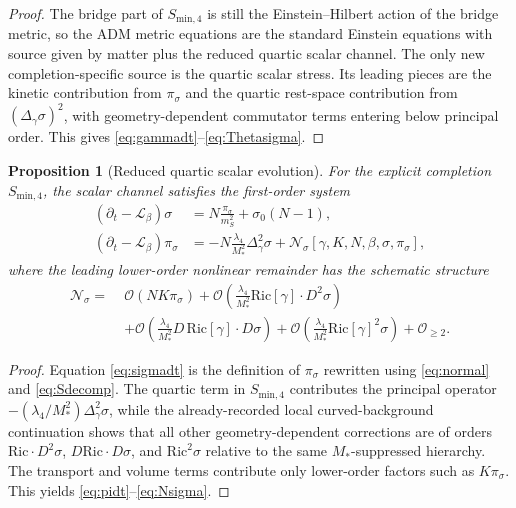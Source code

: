 \documentclass[11pt]{article}
\newcommand{\Ell}{\mathcal{L}}
\newtheorem{proposition}{Proposition}
\begin{document}
\begin{proof}
The bridge part of \(S_{\mathrm{min},4}\) is still the Einstein--Hilbert action of the bridge metric, so the ADM metric equations are the standard Einstein equations with source given by matter plus the reduced quartic scalar channel. The only new completion-specific source is the quartic scalar stress. Its leading pieces are the kinetic contribution from \(\pi_\sigma\) and the quartic rest-space contribution from \((\Delta_\gamma\sigma)^2\), with geometry-dependent commutator terms entering below principal order. This gives \eqref{eq:gammadt}--\eqref{eq:Thetasigma}.
\end{proof}

\begin{proposition}[Reduced quartic scalar evolution]
For the explicit completion \(S_{\mathrm{min},4}\), the scalar channel satisfies the first-order system
\begin{align}
(\partial_t-\Ell_\beta)\sigma
&=
N\frac{\pi_\sigma}{m_S^2}
+\sigma_0(N-1),
\label{eq:sigmadt}
\\
(\partial_t-\Ell_\beta)\pi_\sigma
&=
-N\frac{\lambda_4}{M_*^2}\Delta_\gamma^2\sigma
+\mathcal N_\sigma[\gamma,K,N,\beta,\sigma,\pi_\sigma],
\label{eq:pidt}
\end{align}
where the leading lower-order nonlinear remainder has the schematic structure
\begin{align}
\mathcal N_\sigma
=\;&
\mathcal O(NK\pi_\sigma)
+\mathcal O\!\left(\frac{\lambda_4}{M_*^2}\mathrm{Ric}[\gamma]\cdot D^2\sigma\right)
\nonumber\\
&+\mathcal O\!\left(\frac{\lambda_4}{M_*^2}D\,\mathrm{Ric}[\gamma]\cdot D\sigma\right)
+\mathcal O\!\left(\frac{\lambda_4}{M_*^2}\mathrm{Ric}[\gamma]^2\sigma\right)
+\mathcal O_{\ge 2}.
\label{eq:Nsigma}
\end{align}
\end{proposition}

\begin{proof}
Equation \eqref{eq:sigmadt} is the definition of \(\pi_\sigma\) rewritten using \eqref{eq:normal} and \eqref{eq:Sdecomp}. The quartic term in \(S_{\mathrm{min},4}\) contributes the principal operator \(-(\lambda_4/M_*^2)\Delta_\gamma^2\sigma\), while the already-recorded local curved-background continuation shows that all other geometry-dependent corrections are of orders \(\mathrm{Ric}\cdot D^2\sigma\), \(D\mathrm{Ric}\cdot D\sigma\), and \(\mathrm{Ric}^2\sigma\) relative to the same \(M_*\)-suppressed hierarchy. The transport and volume terms contribute only lower-order factors such as \(K\pi_\sigma\). This yields \eqref{eq:pidt}--\eqref{eq:Nsigma}.
\end{proof}
\end{document}
